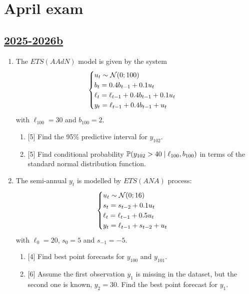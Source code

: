 


\newpage
\thispagestyle{empty}
\section{April exam}


\subsection[2025-2026b]{\hyperref[sec:sol_kr_03_2025_2026b]{2025-2026b}}
\label{sec:kr_03_2025_2026b} %

\begin{enumerate}
\item   The $ETS(AAdN)$ model is given by the system
  \[
  \begin{cases}
  u_t  \sim \cN(0; 100) \\
  b_t = 0.4 b_{t-1} + 0.1 u_t \\
  \ell_t = \ell_{t-1} + 0.4 b_{t-1} + 0.1 u_t \\
  y_t = \ell_{t-1} + 0.4 b_{t-1} + u_t \\
  \end{cases}
  \]
  with $\ell_{100} = 30$ and $b_{100} = 2$.
\begin{enumerate}
  \item {[5]} Find the 95\% predictive interval for $y_{102}$.
  \item {[5]} Find conditional probability $\P(y_{102} > 40 \mid \ell_{100}, b_{100})$ in terms of the standard normal distribution function.
\end{enumerate}

\item   The semi-annual $y_t$ is modelled by $ETS(ANA)$ process:    
    \[
    \begin{cases}
        u_t \sim \cN(0; 16) \\
        s_t = s_{t-2} + 0.1 u_t \\
        \ell_t = \ell_{t-1}  + 0.5 u_t \\
        y_t = \ell_{t-1} + s_{t-2} + u_t \\
    \end{cases}    
    \]
with $\ell_0 = 20$, $s_0 = 5$ and $s_{-1} = -5$.

\begin{enumerate}
    \item {[4]} Find best point forecasts for $y_{100}$ and $y_{101}$.
    \item {[6]} Assume the first observation $y_1$ is missing in the dataset, but the second one is known, $y_2 = 30$. 
    Find the best point forecast for $y_1$.
\end{enumerate}


\end{enumerate}
